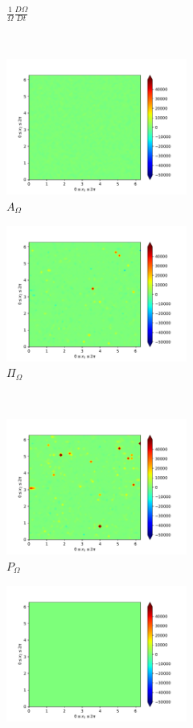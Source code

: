 \begin{figure}[H]
\begin{subfigure}[H]{0.45\textwidth}
        \caption{$\frac{1}{\Omega} \frac{D \Omega}{Dt}$}
    \end{subfigure}
    ~
    \begin{subfigure}{0.45\textwidth}
        \includegraphics[height=1.75in]{media/run-cds-65-25k/A-enst-449}
        \caption{$A_{\Omega}$}
    \end{subfigure}
    \newline
    \begin{subfigure}{0.45\textwidth}
        \includegraphics[height=1.75in]{media/run-cds-65-25k/Pi-enst-449}
        \caption{$\Pi_{\Omega}$}
    \end{subfigure}
    ~
    \begin{subfigure}{0.45\textwidth}
        \includegraphics[height=1.75in]{media/run-cds-65-25k/P-enst-449}
        \caption{$P_{\Omega}$}
    \end{subfigure}
    \newline
    \begin{subfigure}{0.45\textwidth}
        \includegraphics[height=1.75in]{media/run-cds-65-25k/B-enst-449}

\end{subfigure}
\end{figure}
